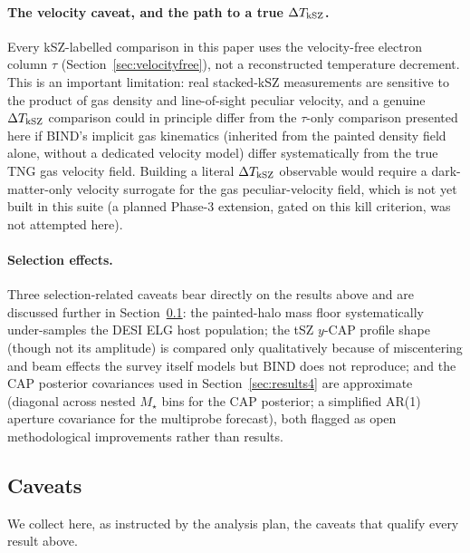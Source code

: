 \documentclass[11pt]{article}
\begin{document}
\paragraph{The velocity caveat, and the path to a true $\Delta T_{\rm kSZ}$.}
Every kSZ-labelled comparison in this paper uses the velocity-free electron
column $\tau$ (Section~\ref{sec:velocityfree}), not a reconstructed
temperature decrement. This is an important limitation: real stacked-kSZ
measurements are sensitive to the product of gas density and line-of-sight
peculiar velocity, and a genuine $\Delta T_{\rm kSZ}$ comparison could in
principle differ from the $\tau$-only comparison presented here if BIND's
implicit gas kinematics (inherited from the painted density field alone,
without a dedicated velocity model) differ systematically from the true TNG
gas velocity field. Building a literal $\Delta T_{\rm kSZ}$ observable would
require a dark-matter-only velocity surrogate for the gas peculiar-velocity
field, which is not yet built in this suite (a planned Phase-3 extension,
gated on this kill criterion, was not attempted here).

\paragraph{Selection effects.} Three selection-related caveats bear directly
on the results above and are discussed further in Section~\ref{sec:caveats}:
the painted-halo mass floor systematically under-samples the DESI ELG host
population; the tSZ $y$-CAP profile shape (though not its amplitude) is
compared only qualitatively because of miscentering and beam effects the
survey itself models but BIND does not reproduce; and the CAP posterior
covariances used in Section~\ref{sec:results4} are approximate (diagonal
across nested $M_\star$ bins for the CAP posterior; a simplified AR(1)
aperture covariance for the multiprobe forecast), both flagged as open
methodological improvements rather than results.

\subsection{Caveats}\label{sec:caveats}

We collect here, as instructed by the analysis plan, the caveats that qualify
every result above.
\end{document}
